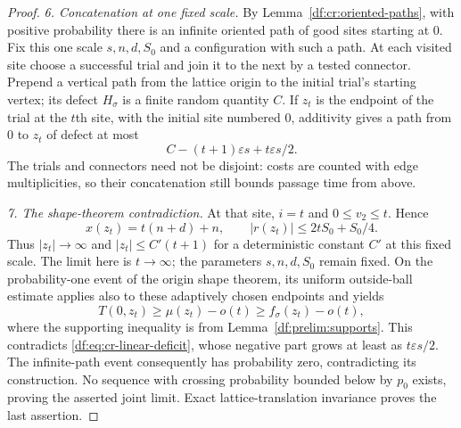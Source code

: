 \begin{proof}
\emph{6. Concatenation at one fixed scale.}
By Lemma~\ref{df:cr:oriented-paths}, with positive probability there is an
infinite oriented path of good sites starting at $0$. Fix this one scale
$s,n,d,S_0$ and a configuration with such a path. At each visited site
choose a successful trial and join it to the next by a tested connector.
Prepend a vertical path from the lattice origin to the initial trial's
starting vertex; its defect $H_\sigma$ is a finite random quantity $C$.
If $z_t$ is the endpoint of the trial at the $t$th site, with the initial
site numbered $0$, additivity gives a path from $0$ to $z_t$ of defect
at most
\begin{equation}\label{df:eq:cr-linear-deficit}
 C-(t+1)\varepsilon s+t\varepsilon s/2.
\end{equation}
The trials and connectors need not be disjoint: costs are counted with
edge multiplicities, so their concatenation still bounds passage time
from above.

\emph{7. The shape-theorem contradiction.}
At that site, $i=t$ and $0\le v_2\le t$. Hence
\[
 x(z_t)=t(n+d)+n,
 \qquad |r(z_t)|\le2tS_0+S_0/4.
\]
Thus $|z_t|\to\infty$ and $|z_t|\le C'(t+1)$ for a deterministic
constant $C'$ at this fixed scale. The limit here is $t\to\infty$;
the parameters $s,n,d,S_0$ remain fixed. On the probability-one event
of the origin shape theorem, its uniform outside-ball estimate applies
also to these adaptively chosen endpoints and yields
\[
 T(0,z_t)\ge\mu(z_t)-o(t)\ge f_\sigma(z_t)-o(t),
\]
where the supporting inequality is from Lemma~\ref{df:prelim:supports}.
This contradicts \eqref{df:eq:cr-linear-deficit}, whose negative part grows
at least as $t\varepsilon s/2$. The infinite-path event consequently has
probability zero, contradicting its construction. No sequence with
crossing probability bounded below by $p_0$ exists, proving the asserted
joint limit. Exact lattice-translation invariance proves the last assertion.
\end{proof}
